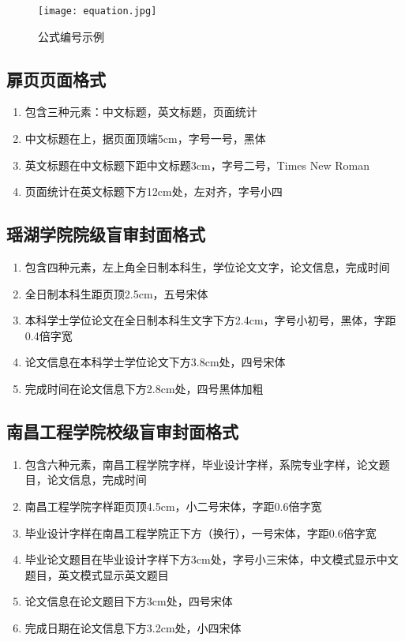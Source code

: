 \documentclass{nitthesis}
\begin{document}
\begin{figure}[H]
    \begin{center}
        \texttt{[image: equation.jpg]}
        \caption{公式编号示例}
        \label{equ.Range}
    \end{center}
\end{figure}

\subsection{扉页页面格式}

\begin{enumerate}
    \item 包含三种元素：中文标题，英文标题，页面统计
    \item 中文标题在上，据页面顶端5cm，字号一号，黑体
    \item 英文标题在中文标题下距中文标题3cm，字号二号，Times New Roman
    \item 页面统计在英文标题下方12cm处，左对齐，字号小四
\end{enumerate}

\subsection{瑶湖学院院级盲审封面格式}

\begin{enumerate}
    \item 包含四种元素，左上角全日制本科生，学位论文文字，论文信息，完成时间
    \item 全日制本科生距页顶2.5cm，五号宋体
    \item 本科学士学位论文在全日制本科生文字下方2.4cm，字号小初号，黑体，字距0.4倍字宽
    \item 论文信息在本科学士学位论文下方3.8cm处，四号宋体
    \item 完成时间在论文信息下方2.8cm处，四号黑体加粗
\end{enumerate}

\subsection{南昌工程学院校级盲审封面格式}

\begin{enumerate}
    \item 包含六种元素，南昌工程学院字样，毕业设计字样，系院专业字样，论文题目，论文信息，完成时间
    \item 南昌工程学院字样距页顶4.5cm，小二号宋体，字距0.6倍字宽
    \item 毕业设计字样在南昌工程学院正下方（换行），一号宋体，字距0.6倍字宽
    \item 毕业论文题目在毕业设计字样下方3cm处，字号小三宋体，中文模式显示中文题目，英文模式显示英文题目
    \item 论文信息在论文题目下方3cm处，四号宋体
    \item 完成日期在论文信息下方3.2cm处，小四宋体
\end{enumerate}
\end{document}

